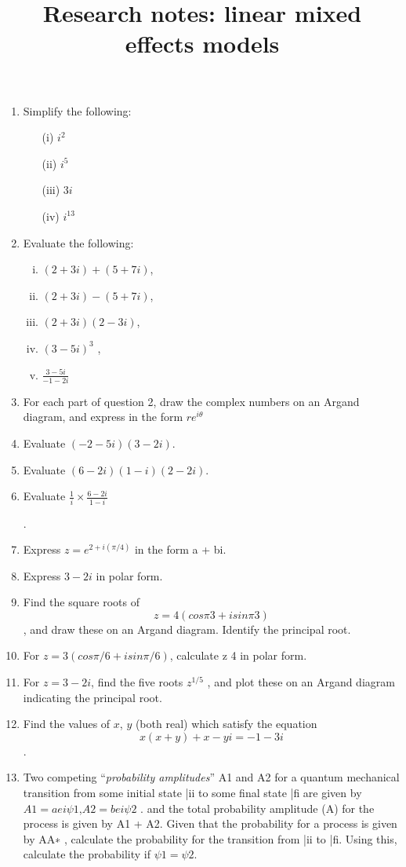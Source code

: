 \documentclass[12pt, a4paper]{report}
\title{Research notes: linear mixed effects models}
\author{ } \date{ }
\theoremstyle{plain}
\theoremstyle{definition}
\theoremstyle{remark}
\begin{document}
\begin{enumerate}
\item Simplify the following:
\begin{multicols}{2}
\begin{itemize}
	\item[(i)]  $i^2$
	\item[(ii)]  $i^5$
	\item[(iii)]  $3i$
	\item[(iv)]  $i^13$
\end{itemize}
\end{multicols}
\item Evaluate the following:
\begin{multicols}{2}
\begin{enumerate}[(i)]
	\item $(2 + 3i) + (5 + 7i)$,
	\item $(2 + 3i) − (5 + 7i)$,
	\item $(2 + 3i)(2 − 3i)$,
	\item $(3 − 5i)^3$
	,
	\item ${\displaystyle \frac{3 − 5i}{	−1 − 2i} }$

	
\end{enumerate}
\end{multicols}


\item For each part of question 2, draw the complex numbers on an Argand diagram, and express in
the form $re^{i\theta}$

\item Evaluate $(-2 - 5i)(3- 2i)$.
\item Evaluate $(6 - 2i)(1 - i)(2 - 2i)$.
\item Evaluate 
${\displaystyle \frac{1}{i} \times \frac{6-2i}{1-i} }$


.
\item Express $z = e^{2+i(\pi/4)}$ in the form a + bi.
\item Express $3 - 2i$ in polar form.
\item Find the square roots of \[z = 4(cos π
3 + isin π
3
)\], and draw these on an Argand diagram. Identify
the principal root.
\item For $z = 3(cos \pi/6 + isin \pi/6)$, calculate z
4
in polar form.
\item For $z = 3 - 2i$, find the five roots $z^{1/5}$
, and plot these on an Argand diagram indicating the
principal root.


\item Find the values of $x$, $y$ (both real) which satisfy the equation \[ x(x + y) + x − yi = −1 − 3i\].
\item Two competing “\textit{probability amplitudes}” A1 and A2 for a quantum mechanical transition from
some initial state |ii to some final state |fi are given by
$A1 = aei\psi1$,$ A2 = bei\psi2$
.
and the total probability amplitude (A) for the process is given by A1 + A2. Given that the probability
for a process is given by AA∗
, calculate the probability for the transition from |ii to |fi.
Using this, calculate the probability if $\psi1 = \psi2$.


\end{enumerate}
\end{document}
